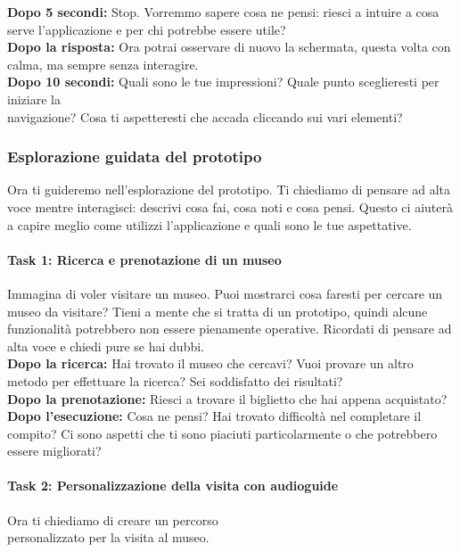 \documentclass{article}
\begin{document}
\textbf{Dopo 5 secondi:} 
Stop. Vorremmo sapere cosa ne pensi: riesci a intuire a cosa serve l’applicazione e per chi potrebbe essere utile?\\

\textbf{Dopo la risposta:} Ora potrai osservare di nuovo la schermata, questa volta con calma, ma sempre senza interagire.\\

\textbf{Dopo 10 secondi:} 
Quali sono le tue impressioni? Quale punto sceglieresti per iniziare la\\ navigazione? Cosa ti aspetteresti che accada cliccando sui vari elementi?

\subsubsection{Esplorazione guidata del prototipo}
Ora ti guideremo nell'esplorazione del prototipo. Ti chiediamo di pensare ad alta voce mentre interagisci: descrivi cosa fai, cosa noti e cosa pensi. Questo ci aiuterà a capire meglio come utilizzi l’applicazione e quali sono le tue aspettative.

\paragraph*{Task 1: Ricerca e prenotazione di un museo}
Immagina di voler visitare un museo. Puoi mostrarci cosa faresti per cercare un museo da visitare? Tieni a mente che si tratta di un prototipo, quindi alcune funzionalità potrebbero non essere pienamente operative. Ricordati di pensare ad alta voce e chiedi pure se hai dubbi.\\

\textbf{Dopo la ricerca:} 
Hai trovato il museo che cercavi? Vuoi provare un altro metodo per effettuare la ricerca? Sei soddisfatto dei risultati?\\

\textbf{Dopo la prenotazione:} 
Riesci a trovare il biglietto che hai appena acquistato?\\

\textbf{Dopo l'esecuzione:} 
Cosa ne pensi? Hai trovato difficoltà nel completare il compito? Ci sono aspetti che ti sono piaciuti particolarmente o che potrebbero essere migliorati?

\paragraph*{Task 2: Personalizzazione della visita con audioguide}
Ora ti chiediamo di creare un percorso\\ personalizzato per la visita al museo.\\
\end{document}
